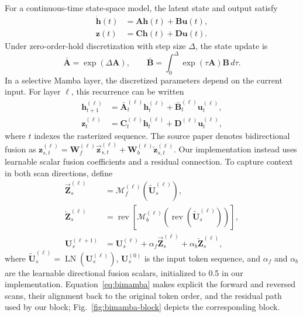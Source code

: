 \documentclass[conference]{IEEEtran}
\begin{document}
For a continuous-time state-space model, the latent state and output satisfy
\begin{align}
    \dot{\mathbf{h}}(t) &= \mathbf{A}\mathbf{h}(t)+\mathbf{B}\mathbf{u}(t),\\
    \mathbf{z}(t) &= \mathbf{C}\mathbf{h}(t)+\mathbf{D}\mathbf{u}(t).
    \label{eq:ssm-continuous}
\end{align}
Under zero-order-hold discretization with step size $\Delta$, the state update is
\begin{equation}
    \bar{\mathbf{A}}=\exp(\Delta\mathbf{A}),\qquad
    \bar{\mathbf{B}}=\int_{0}^{\Delta}\exp(\tau\mathbf{A})\mathbf{B}\,d\tau.
    \label{eq:ssm-discretization}
\end{equation}
In a selective Mamba layer, the discretized parameters depend on the current input. For layer $\ell$, this recurrence can be written
\begin{align}
    \mathbf{h}^{(\ell)}_{t+1} &= \bar{\mathbf{A}}^{(\ell)}_t\mathbf{h}^{(\ell)}_t+\bar{\mathbf{B}}^{(\ell)}_t\mathbf{u}^{(\ell)}_t,\\
    \mathbf{z}^{(\ell)}_t &= \mathbf{C}^{(\ell)}_t\mathbf{h}^{(\ell)}_t+\mathbf{D}^{(\ell)}\mathbf{u}^{(\ell)}_t,
    \label{eq:ssm-selective}
\end{align}
where $t$ indexes the rasterized sequence. The source paper denotes bidirectional fusion as $\mathbf{z}_{s,t}^{(\ell)}=\mathbf{W}^{(\ell)}_f\overrightarrow{\mathbf{z}}_{s,t}^{(\ell)}+\mathbf{W}^{(\ell)}_b\overleftarrow{\mathbf{z}}_{s,t}^{(\ell)}$. Our implementation instead uses learnable scalar fusion coefficients and a residual connection. To capture context in both scan directions, define
\begin{align}
    \overrightarrow{\mathbf{Z}}_s^{(\ell)} &= \mathcal{M}^{(\ell)}_f\!\left(\widetilde{\mathbf{U}}_s^{(\ell)}\right),\\
    \overleftarrow{\mathbf{Z}}_s^{(\ell)} &= \operatorname{rev}\!\left[\mathcal{M}^{(\ell)}_b\!\left(\operatorname{rev}(\widetilde{\mathbf{U}}_s^{(\ell)})\right)\right],\\
    \mathbf{U}_s^{(\ell+1)} &= \mathbf{U}_s^{(\ell)}+\alpha_f\overrightarrow{\mathbf{Z}}_s^{(\ell)}+\alpha_b\overleftarrow{\mathbf{Z}}_s^{(\ell)},
    \label{eq:bimamba}
\end{align}
where $\widetilde{\mathbf{U}}_s^{(\ell)}=\operatorname{LN}(\mathbf{U}_s^{(\ell)})$, $\mathbf{U}_s^{(0)}$ is the input token sequence, and $\alpha_f$ and $\alpha_b$ are the learnable directional fusion scalars, initialized to 0.5 in our implementation. Equation~\eqref{eq:bimamba} makes explicit the forward and reversed scans, their alignment back to the original token order, and the residual path used by our block; Fig.~\ref{fig:bimamba-block} depicts the corresponding block.
\end{document}

